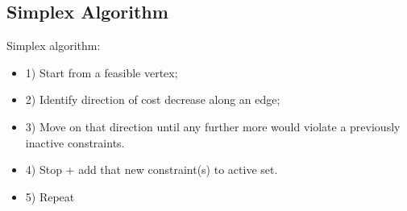 \subsection{Simplex Algorithm}
Simplex algorithm:
\begin{itemize}
	\item 1) Start from a feasible vertex;
	
	\item 2) Identify direction of cost decrease along an edge;
	
	\item 3) Move on that direction until any further more would violate a previously inactive constraints.
	
	\item 4) Stop + add that new constraint(s) to active set.
	
	\item 5) Repeat
\end{itemize}

















